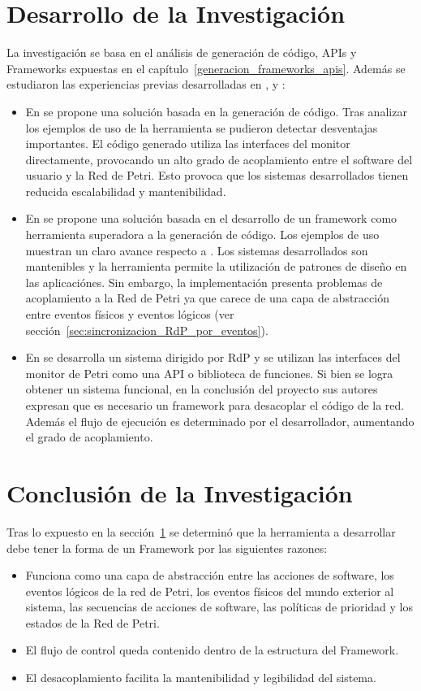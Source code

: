 \section{Desarrollo de la Investigación}
\label{sec:investigacion_desarrollo}
La investigación se basa en el análisis de generación de código, APIs y
Frameworks expuestas en el capítulo~\ref{generacion_frameworks_apis}. Además se
estudiaron las experiencias previas desarrolladas en \cite{codegen}, \cite{chimp} y
\cite{Bentivegna-Ludemann}:
\begin{itemize}
  \item En \cite{codegen} se propone una solución basada en la generación de
  código. Tras analizar los ejemplos de uso de la herramienta se pudieron
  detectar desventajas importantes. El código generado utiliza las interfaces
  del monitor directamente, provocando un alto grado de acoplamiento entre el
  software del usuario y la Red de Petri. Esto provoca que los sistemas
  desarrollados tienen reducida escalabilidad y mantenibilidad.
  \item En \cite{chimp} se propone una solución basada en el desarrollo de un
  framework como herramienta superadora a la generación de código. Los ejemplos
  de uso muestran un claro avance respecto a \cite{codegen}. Los
  sistemas desarrollados son mantenibles y la herramienta permite la
  utilización de patrones de diseño en las aplicaciónes.
  Sin embargo, la implementación presenta problemas de acoplamiento a la Red de
  Petri ya que carece de una capa de abstracción entre eventos físicos y eventos
  lógicos (ver sección~\ref{sec:sincronizacion_RdP_por_eventos}).
  \item En \cite{Bentivegna-Ludemann} se desarrolla un sistema dirigido por RdP
  y se utilizan las interfaces del monitor de Petri como una API o
  biblioteca de funciones. Si bien se logra obtener un sistema funcional, en la
  conclusión del proyecto sus autores expresan que es necesario un framework
  para desacoplar el código de la red. Además el flujo de ejecución es
  determinado por el desarrollador, aumentando el grado de acoplamiento.
\end{itemize}

\section{Conclusión de la Investigación}
Tras lo expuesto en la sección~\ref{sec:investigacion_desarrollo} se determinó
que la herramienta a desarrollar debe tener la forma de un Framework por las
siguientes razones:
\begin{itemize}
  \item Funciona como una capa de abstracción entre las acciones de software,
  los eventos lógicos de la red de Petri, los eventos físicos del mundo
  exterior al sistema, las secuencias de acciones de software, las políticas de
  prioridad y los estados de la Red de Petri.
  \item El flujo de control queda contenido dentro de la estructura del
  Framework.
  \item El desacoplamiento facilita la mantenibilidad y legibilidad del sistema.
\end{itemize} 
